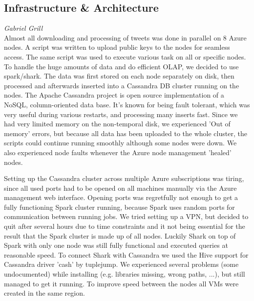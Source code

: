 \subsection*{Infrastructure \& Architecture}
\emph{Gabriel Grill} \\
Almost all downloading and processing of tweets was done in parallel on 8 Azure nodes. A script was written to upload public keys to the nodes for seamless access. The same script was used to execute various task on all or specific nodes. To handle the huge amounts of data and do efficient OLAP, we decided to use spark/shark. The data was first stored on each node separately on disk, then processed and afterwards inserted into a Cassandra DB cluster running on the nodes. The Apache Cassandra project is open source implementation of a NoSQL, column-oriented data base. It's known for being fault tolerant, which was very useful during various restarts, and processing many inserts fast. Since we had very limited memory on the non-temporal disk, we experienced 'Out of memory' errors, but because all data has been uploaded to the whole cluster, the scripts could continue running smoothly although some nodes were down. We also experienced node faults whenever the Azure node management 'healed' nodes.

Setting up the Cassandra cluster across multiple Azure subscriptions was tiring, since all used ports had to be opened on all machines manually via the Azure management web interface. Opening ports was regretfully not enough to get a fully functioning Spark cluster running, because Spark uses random ports for communication between running jobs. We tried setting up a VPN, but decided to quit after several hours due to time constraints and it not being essential for the result that the Spark cluster is made up of all nodes. Luckily Shark on top of Spark with only one node was still fully functional and executed queries at reasonable speed. To connect Shark with Cassandra we used the Hive support for Cassandra driver 'cash' by tuplejump. We experienced several problems (some undocumented) while installing (e.g. libraries missing, wrong paths, ...), but still managed to get it running. To improve speed between the nodes all VMs were created in the same region. 
